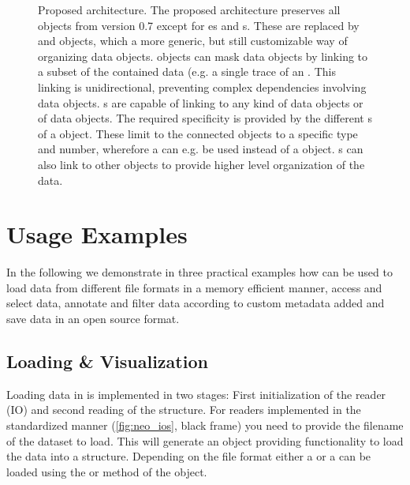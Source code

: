 \begin{figure}
    \centering
    
    \caption[Proposed  architecture]{Proposed  architecture. The proposed  architecture preserves all objects from  version 0.7 except for es and s. These are replaced by  and  objects, which a more generic, but still customizable way of organizing data objects.  objects can mask data objects by linking to a subset of the contained data (e.g. a single trace of an . This linking is unidirectional, preventing complex dependencies involving data objects. s are capable of linking to any kind of data objects or  of data objects. The required specificity is provided by the different s of a  object. These limit to the connected objects to a specific type and number, wherefore a  can e.g. be used instead of a  object. s can also link to other  objects to provide higher level organization of the data.}
    \label{fig:neo_architecture_future}
\end{figure}


\section{ Usage Examples}
In the following we demonstrate in three practical examples how  can be used to load data from different file formats in a memory efficient manner, access and select data, annotate and filter data according to custom metadata added and save data in an open source format.

\subsection{Loading \& Visualization}
Loading data in  is implemented in two stages: First initialization of the reader (IO) and second reading of the  structure. For readers implemented in the standardized manner (\cref{fig:neo_ios}, black frame) you need to provide the filename of the dataset to load. This will generate an  object providing functionality to load the data into a  structure. Depending on the file format either a   or a   can be loaded using the  or  method of the  object.


